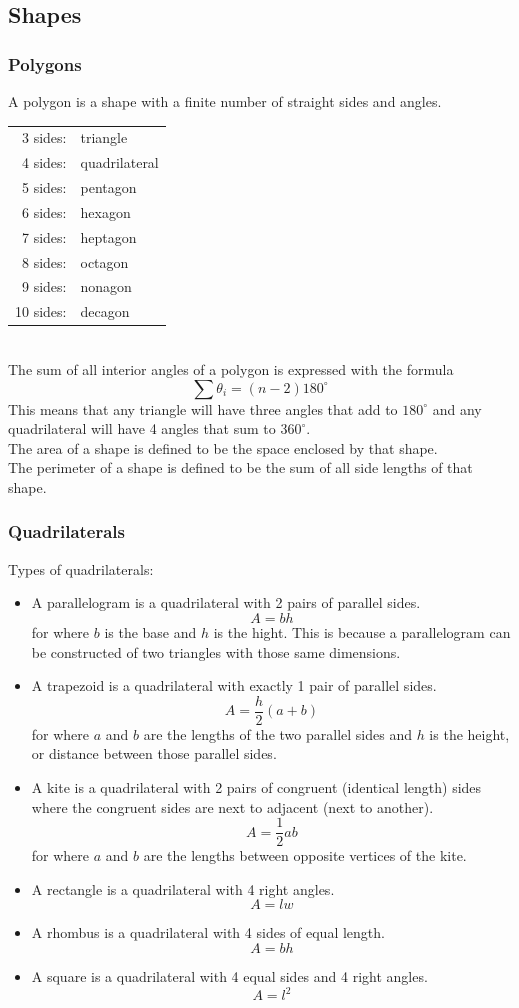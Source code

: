 \subsection{Shapes}

\subsubsection{Polygons}
A polygon is a shape with a finite number of straight sides and angles.\\
\begin{tabular}{rl}
    3 sides: & triangle\\
    4 sides: & quadrilateral\\
    5 sides: & pentagon\\
    6 sides: & hexagon\\
    7 sides: & heptagon\\
    8 sides: & octagon\\
    9 sides: & nonagon\\
    10 sides: & decagon
\end{tabular}\\
The sum of all interior angles of a polygon is expressed with the formula
$$\sum\theta_i=(n-2)180^\circ$$
This means that any triangle will have three angles that add to $180^\circ$ and any quadrilateral will have 4 angles that sum to $360^\circ$.\\
The area of a shape is defined to be the space enclosed by that shape.\\
The perimeter of a shape is defined to be the sum of all side lengths of that shape.

\subsubsection{Quadrilaterals}
Types of quadrilaterals:
\begin{itemize}
    \item A parallelogram is a quadrilateral with 2 pairs of parallel sides.
    $$A=bh$$
    for where $b$ is the base and $h$ is the hight. This is because a parallelogram can be constructed of two triangles with those same dimensions.
    \item A trapezoid is a quadrilateral with exactly 1 pair of parallel sides.
    $$A=\frac{h}{2}(a+b)$$
    for where $a$ and $b$ are the lengths of the two parallel sides and $h$ is the height, or distance between those parallel sides.
    \item A kite is a quadrilateral with 2 pairs of congruent (identical length) sides where the congruent sides are next to adjacent (next to another).
    $$A=\frac{1}{2}ab$$
    for where $a$ and $b$ are the lengths between opposite vertices of the kite.
    \item A rectangle is a quadrilateral with 4 right angles.
    $$A=lw$$
    \item A rhombus is a quadrilateral with 4 sides of equal length.
    $$A=bh$$
    \item A square is a quadrilateral with 4 equal sides and 4 right angles.
    $$A=l^2$$
\end{itemize}

